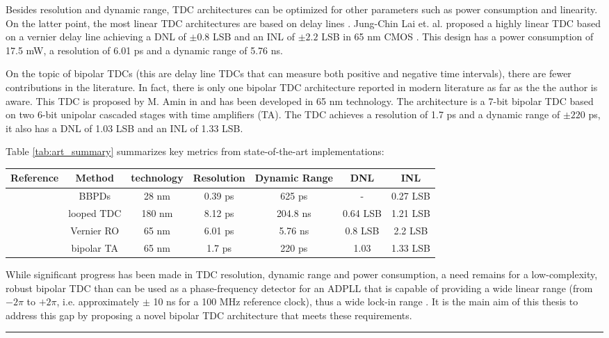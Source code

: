 Besides resolution and dynamic range, TDC architectures can be optimized for other parameters such as power consumption and linearity. On the latter point, the most linear TDC architectures are based on delay lines
\cite{Henzler2010}. Jung-Chin Lai et. al. proposed a highly linear TDC based on a vernier delay line achieving a DNL of $\pm 0.8$ LSB and an INL of $\pm 2.2$ LSB in 65 nm CMOS \cite{Lai2017}. This design has a
power consumption of 17.5 mW, a resolution of 6.01 ps and a dynamic range of 5.76 ns.


On the topic of bipolar TDCs (this are delay line TDCs that can measure both positive and negative time intervals), there are fewer contributions in the literature. In fact, there is only one bipolar TDC architecture
reported in modern literature as far as the the author is aware. This TDC is proposed by M. Amin in \cite{MohammadAmin2022} and has been developed in 65 nm technology. The architecture is a 7-bit bipolar TDC based
on two 6-bit unipolar cascaded stages with time amplifiers (TA). The TDC achieves a resolution of 1.7 ps and a dynamic range of $\pm 220$ ps, it also has a DNL of 1.03 LSB and an INL of 1.33 LSB.

Table \ref{tab:art_summary} summarizes key metrics from state-of-the-art implementations:

{\scriptsize
\begin{tabular*}{1\linewidth}{@{\extracolsep{\fill}}ccccccc}
    \hline
    Reference & Method & technology & Resolution & Dynamic Range & DNL & INL \\
    \hline
    \cite{Meng2025} & BBPDs & 28 nm & 0.39 ps & 625 ps & - & 0.27 LSB \\
    \cite{Narku-Tetteh2014} & looped TDC & 180 nm & 8.12 ps & 204.8 ns & 0.64 LSB & 1.21 LSB \\
    \cite{Lai2017} & Vernier RO & 65 nm & 6.01 ps & 5.76 ns & 0.8 LSB & 2.2 LSB \\
    \cite{MohammadAmin2022} & bipolar TA & 65 nm & 1.7 ps & 220 ps & 1.03 & 1.33 LSB \\
\end{tabular*}
}
\label{tab:art_summary}


While significant progress has been made in TDC resolution, dynamic range and power consumption, a need remains for a low-complexity, robust bipolar TDC than can be used as a phase-frequency detector
for an ADPLL that is capable of providing a wide linear range (from $-2\pi$ to $+2\pi$, i.e. approximately $\pm$ 10 ns for a 100 MHz reference clock), thus a wide lock-in range \cite{Meng2025}. It is the main
aim of this thesis to address this gap by proposing a novel bipolar TDC architecture that meets these requirements.

\noindent\rule{\textwidth}{1pt}